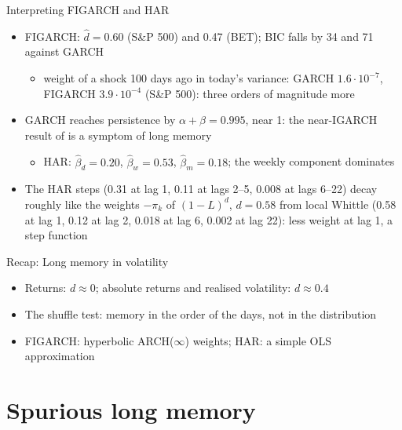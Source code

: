 \begin{frame}{Interpreting FIGARCH and HAR}
\itemsize{\small}
\begin{itemize}
    \item FIGARCH: $\hat d = 0.60$ (S\&P 500) and 0.47 (BET); BIC falls by 34 and 71 against GARCH
    \begin{itemize}
        \item weight of a shock 100 days ago in today's variance: GARCH $1.6 \cdot 10^{-7}$, FIGARCH $3.9 \cdot 10^{-4}$ (S\&P 500): three orders of magnitude more
    \end{itemize}
    \item GARCH reaches persistence by $\alpha + \beta = 0.995$, near 1: the near-IGARCH result of  is a symptom of long memory
    \begin{itemize}
        \item HAR: $\hat\beta_d = 0.20$, $\hat\beta_w = 0.53$, $\hat\beta_m = 0.18$; the weekly component dominates
    \end{itemize}
    \item The HAR steps (0.31 at lag 1, 0.11 at lags 2--5, 0.008 at lags 6--22) decay roughly like the weights $-\pi_k$ of $(1-L)^d$, $d = 0.58$ from local Whittle (0.58 at lag 1, 0.12 at lag 2, 0.018 at lag 6, 0.002 at lag 22): less weight at lag 1, a step function
\end{itemize}
\end{frame}

\begin{frame}{Recap: Long memory in volatility}
\itemsize{\small}
\begin{itemize}
    \item Returns: $d \approx 0$; absolute returns and realised volatility: $d \approx 0.4$
    \item The shuffle test: memory in the order of the days, not in the distribution
    \item FIGARCH: hyperbolic ARCH($\infty$) weights; HAR: a simple OLS approximation
\end{itemize}
\end{frame}


\section{Spurious long memory}

